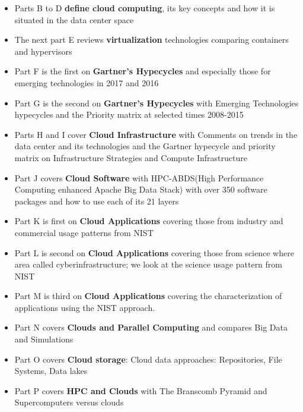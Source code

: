 \begin{itemize}

\item Parts B to D \textbf{define cloud computing}, its key concepts
  and how it is situated in the data center space

\item The next part E reviews \textbf{virtualization} technologies
  comparing containers and hypervisors

\item Part F is the first on \textbf{Gartner’s Hypecycles} and
  especially those for emerging technologies in 2017 and 2016

\item Part G is the second on \textbf{Gartner’s Hypecycles} with
  Emerging Technologies hypecycles and the Priority matrix at selected
  times 2008-2015

\item Parts H and I cover \textbf{Cloud Infrastructure} with Comments
  on trends in the data center and its technologies and the Gartner
  hypecycle and priority matrix on Infrastructure Strategies and
  Compute Infrastructure

\item Part J covers \textbf{Cloud Software} with HPC-ABDS(High
  Performance Computing enhanced Apache Big Data Stack) with over 350
  software packages and how to use each of its 21 layers

\item Part K is first on \textbf{Cloud Applications} covering those
  from industry and commercial usage patterns from NIST

\item Part L is second on \textbf{Cloud Applications} covering those
  from science where area called cyberinfrastructure; we look at the
  science usage pattern from NIST

\item Part M is third on \textbf{Cloud Applications} covering the
  characterization of applications using the NIST approach.

\item Part N covers \textbf{Clouds and Parallel Computing} and
  compares Big Data and Simulations

\item Part O covers \textbf{Cloud storage}: Cloud data approaches:
  Repositories, File Systems, Data lakes

\item Part P covers \textbf{HPC and Clouds} with The Branscomb Pyramid
  and Supercomputers versus clouds


\end{itemize}
